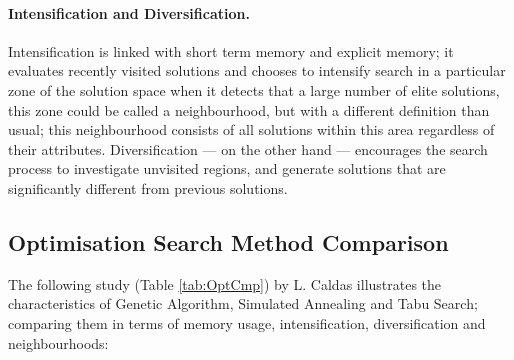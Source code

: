 \paragraph{Intensification and Diversification.} Intensification is linked with short term memory and explicit memory; it evaluates recently visited solutions and chooses to intensify search in a particular zone of the solution space when it detects that a large number of elite solutions, this zone could be called a neighbourhood, but with a different definition than usual; this neighbourhood consists of all solutions within this area regardless of their attributes. Diversification --- on the other hand --- encourages the search process to investigate unvisited regions, and generate solutions that are significantly different from previous solutions.

\clearpage
\subsection{Optimisation Search Method Comparison}
\label{subsec:OptimComp}

The following study (Table \ref{tab:OptCmp}) by L. Caldas \cite{caldas01} illustrates the characteristics of Genetic Algorithm, Simulated Annealing and Tabu Search; comparing them in terms of memory usage, intensification, diversification and neighbourhoods:


